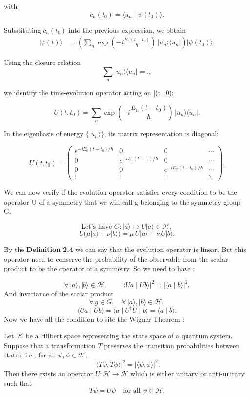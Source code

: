 \documentclass{article}
\begin{document}
with
$$
	c_n(t_0) = \langle u_n \mid \psi(t_0) \rangle .
$$

Substituting $c_n(t_0)$ into the previous expression, we obtain
$$
\begin{align}
	|\psi(t)\rangle
	&=
	\left(
	\sum_n 
	\exp\!\left( -i \frac{E_n (t - t_0)}{\hbar} \right)
	\, |u_n\rangle \langle u_n|
	\right)
	|\psi(t_0)\rangle .
\end{align}
$$

Using the closure relation
$$
	\sum_n |u_n\rangle \langle u_n| = \mathbb{I},
$$

we identify the time-evolution operator acting on |\psi(t_0)\rangle:

$$
	U(t,t_0)
	=
	\sum_n 
	\exp\!\left( -i \frac{E_n (t - t_0)}{\hbar} \right)
	\, |u_n\rangle \langle u_n| .
$$

In the eigenbasis of energy $\{|u_n\rangle\}$, its matrix representation is diagonal:

$$
	U(t,t_0) =
	\begin{pmatrix}
		e^{-i E_0 (t - t_0)/\hbar} & 0 & 0 & \cdots \\
		0 & e^{-i E_1 (t - t_0)/\hbar} & 0 & \cdots \\
		0 & 0 & e^{-i E_2 (t - t_0)/\hbar} & \cdots \\
		\vdots & \vdots & \vdots & \ddots
	\end{pmatrix}.
$$

\newpage
We can now verify if the evolution operator satisfies every condition to be the operator U of a symmetry that we will call g belonging to the symmetry group G.

$$
\text{Let's have } G : |a \rangle \mapsto U|a \rangle \in \mathcal{H},
$$
$$
U\bigl(\mu |a \rangle + \nu |b\rangle \bigr)
=
\mu\, U|a\rangle + \nu\, U|b\rangle .
$$ 

By the \textbf{Definition 2.4} we can say that the evolution operator is linear. But this operator need to conserve the probability of the observable from the scalar product to be the operator of a symmetry. So we need to have :

$$
\forall\, |a\rangle, |b\rangle \in \mathcal{H},
\qquad
\big| \langle Ua \mid Ub \rangle \big|^2
=
\big| \langle a \mid b \rangle \big|^2 .
$$ 
And invariance of the scalar product
$$
\forall\, g \in G , \quad
\forall\, |a \rangle, |b \rangle \in \mathcal{H},
$$
$$
\langle Ua \mid Ub \rangle
=
\langle a \mid U^{\dagger} U \mid b \rangle
=
\langle a \mid b \rangle.
$$
Now we have all the condition to site the Wigner Theorem :
\begin{theorem}
	Let $\mathcal{H}$ be a Hilbert space representing the state space of a quantum system. Suppose that a transformation $T$ preserves the transition probabilities between states, i.e., for all $\psi, \phi \in \mathcal{H}$,
	$$
	|\langle T \psi, T \phi \rangle|^2 = |\langle \psi, \phi \rangle|^2.
	$$
	Then there exists an operator $U: \mathcal{H} \to \mathcal{H}$ which is either unitary or anti-unitary such that
	$$
	T \psi = U \psi \quad \text{for all } \psi \in \mathcal{H}.
	$$
\end{theorem}
\end{document}
